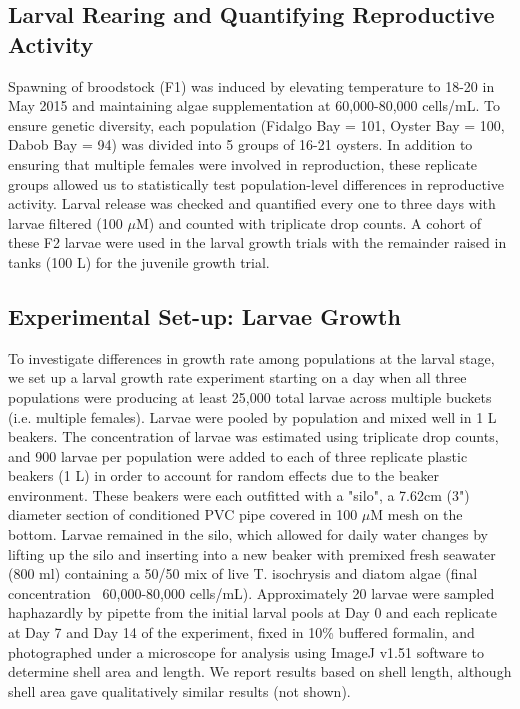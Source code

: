 \documentclass[fleqn,10pt]{wlscirep}
\begin{document}
\subsection*{Larval Rearing and Quantifying Reproductive Activity}
Spawning of broodstock (F1) was induced by elevating temperature to 18-20  in May 2015 and maintaining algae supplementation at 60,000-80,000 cells/mL. To ensure genetic diversity, each population (Fidalgo Bay = 101, Oyster Bay = 100, Dabob Bay = 94) was divided into 5 groups of 16-21 oysters. In addition to ensuring that multiple females were involved in reproduction, these replicate groups allowed us to statistically test population-level differences in reproductive activity. Larval release was checked and quantified every one to three days with larvae filtered (100 $\mu$M) and counted with triplicate drop counts. A cohort of these F2 larvae were used in the larval growth trials with the remainder raised in tanks (100 L) for the juvenile growth trial. 

\subsection*{Experimental Set-up: Larvae Growth}
To investigate differences in growth rate among populations at the larval stage, we set up a larval growth rate experiment starting on a day when all three populations were producing at least 25,000 total larvae across multiple buckets (i.e. multiple females). Larvae were pooled by population and mixed well in 1 L beakers. The concentration of larvae was estimated using triplicate drop counts, and 900 larvae per population were added to each of three replicate plastic beakers (1 L) in order to account for random effects due to the beaker environment. These beakers were each outfitted with a "silo", a 7.62cm (3") diameter section of conditioned PVC pipe covered in 100 $\mu$M mesh on the bottom. Larvae remained in the silo, which allowed for daily water changes by lifting up the silo and inserting into a new beaker with premixed fresh seawater (800 ml) containing a 50/50 mix of live T. isochrysis and diatom algae (final concentration ~60,000-80,000 cells/mL). Approximately 20 larvae were sampled haphazardly by pipette from the initial larval pools at Day 0 and each replicate at Day 7 and Day 14 of the experiment, fixed in 10\% buffered formalin, and photographed under a microscope for analysis using ImageJ v1.51\cite{Schneider2012-js} software to determine shell area and length. We report results based on shell length, although shell area gave qualitatively similar results (not shown).
\end{document}
